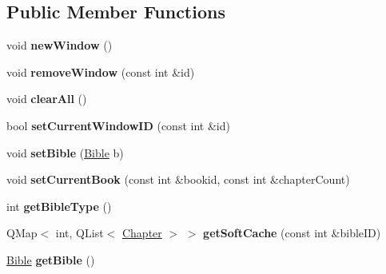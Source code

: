 \subsection*{Public Member Functions}
\begin{DoxyCompactItemize}
\item 
\hypertarget{classWindowCache_ab82c978bb59d65ec4000f9c7881341e4}{
void {\bfseries newWindow} ()}
\label{classWindowCache_ab82c978bb59d65ec4000f9c7881341e4}

\item 
\hypertarget{classWindowCache_abde6a44bf7d1ee74f5e0df76318d122e}{
void {\bfseries removeWindow} (const int \&id)}
\label{classWindowCache_abde6a44bf7d1ee74f5e0df76318d122e}

\item 
\hypertarget{classWindowCache_abd278b1ee7fc49c4c9b8c903beba951d}{
void {\bfseries clearAll} ()}
\label{classWindowCache_abd278b1ee7fc49c4c9b8c903beba951d}

\item 
\hypertarget{classWindowCache_ac6edb962fa1a8e45411549c56f0efe56}{
bool {\bfseries setCurrentWindowID} (const int \&id)}
\label{classWindowCache_ac6edb962fa1a8e45411549c56f0efe56}

\item 
\hypertarget{classWindowCache_ab2b5db93f83cb93e43cfe8b8dbbd5628}{
void {\bfseries setBible} (\hyperlink{classBible}{Bible} b)}
\label{classWindowCache_ab2b5db93f83cb93e43cfe8b8dbbd5628}

\item 
\hypertarget{classWindowCache_a99be6dddf13d1948d73b1086be05ccf0}{
void {\bfseries setCurrentBook} (const int \&bookid, const int \&chapterCount)}
\label{classWindowCache_a99be6dddf13d1948d73b1086be05ccf0}

\item 
\hypertarget{classWindowCache_aa4149a2481f8a0815a1f14031bac5209}{
int {\bfseries getBibleType} ()}
\label{classWindowCache_aa4149a2481f8a0815a1f14031bac5209}

\item 
\hypertarget{classWindowCache_a6e0ecd47526d5b128fda2fc58ccb5a4a}{
QMap$<$ int, QList$<$ \hyperlink{structChapter}{Chapter} $>$ $>$ {\bfseries getSoftCache} (const int \&bibleID)}
\label{classWindowCache_a6e0ecd47526d5b128fda2fc58ccb5a4a}

\item 
\hypertarget{classWindowCache_ade273ab129b581d4982140fc9b2762e1}{
\hyperlink{classBible}{Bible} {\bfseries getBible} ()}
\label{classWindowCache_ade273ab129b581d4982140fc9b2762e1}

\end{DoxyCompactItemize}
